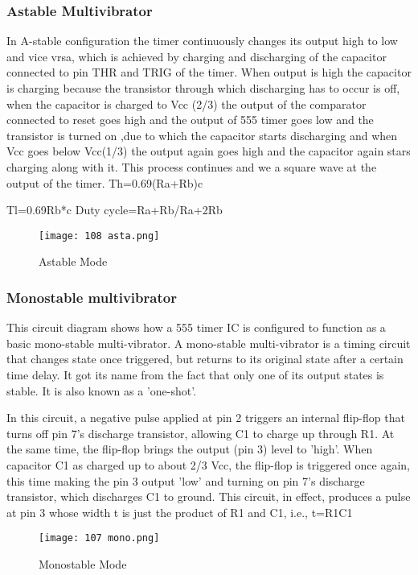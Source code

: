 \documentclass{article}
\begin{document}
\subsubsection{Astable Multivibrator}
 In A-stable configuration the timer continuously changes its output high to low and vice vrsa, which is achieved by charging and discharging of the capacitor connected to pin THR and TRIG of the timer. When output is high the capacitor is charging because the transistor through which discharging has to occur is off, when the capacitor is charged to Vcc (2/3) the output of the comparator connected to reset goes high and  the output of 555 timer goes low and the transistor is turned on ,due to which the capacitor starts discharging and when Vcc goes below Vcc(1/3) the output again goes high and the capacitor again stars charging  along with it. This process continues and we a square wave at the output of the timer.
 Th=0.69(Ra+Rb)c\par
 Tl=0.69Rb*c
 Duty cycle=Ra+Rb/Ra+2Rb
 
 
\begin{figure*}[h]
	\centering
	\texttt{[image: 108 asta.png]}
	\caption{Astable Mode}
	\label{FBD}
\end{figure*}


\subsubsection{Monostable multivibrator}
This circuit diagram shows how a 555 timer IC is configured to function as a basic mono-stable multi-vibrator. A mono-stable multi-vibrator is a timing circuit that changes state once triggered, but returns to its original state after a certain time delay.  It  got its name from the fact that only one of its output states is stable.  It is also known as a 'one-shot'.
   
In this circuit, a negative pulse applied at pin 2 triggers an internal flip-flop that turns off pin 7's discharge transistor, allowing C1 to charge up through R1. At the same time, the flip-flop brings the output (pin 3) level to 'high'.  When capacitor C1 as charged up to about 2/3 Vcc, the flip-flop is triggered once again, this time making the pin 3 output 'low' and turning on pin 7's discharge transistor, which discharges C1 to ground. This circuit, in effect, produces a pulse at pin 3 whose width t is just the product of R1 and C1, i.e., t=R1C1
\begin{figure*}[h]
	\centering
	\texttt{[image: 107 mono.png]}
	\caption{Monostable Mode}
	\label{FBD}
\end{figure*}
\end{document}

